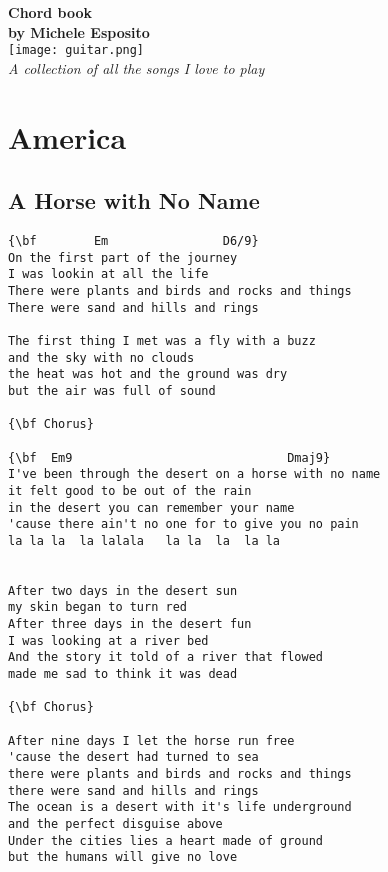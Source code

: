 \documentclass[a4paper]{article}
\begin{document}
\begin{center}
\vspace{3cm}
{\bf{\huge Chord book}}\\
\vspace{2cm}
{\bf by Michele Esposito} \\
\vspace{2cm}
\texttt{[image: guitar.png]}\\
\vspace{1cm}
\emph{A collection of all the songs I love to play}
\end{center}
\newpage
\tableofcontents
\newpage

\section{America} %
\label{sec:America}
\subsection{A Horse with No Name} %
\label{sub:A Horse with No Name}
\begin{Verbatim}[commandchars=\\\{\}]
{\bf        Em                D6/9}
On the first part of the journey
I was lookin at all the life
There were plants and birds and rocks and things
There were sand and hills and rings

The first thing I met was a fly with a buzz
and the sky with no clouds
the heat was hot and the ground was dry
but the air was full of sound

{\bf Chorus}

{\bf  Em9                              Dmaj9}
I've been through the desert on a horse with no name
it felt good to be out of the rain
in the desert you can remember your name
'cause there ain't no one for to give you no pain
la la la  la lalala   la la  la  la la


After two days in the desert sun
my skin began to turn red
After three days in the desert fun
I was looking at a river bed
And the story it told of a river that flowed
made me sad to think it was dead

{\bf Chorus}

After nine days I let the horse run free
'cause the desert had turned to sea
there were plants and birds and rocks and things
there were sand and hills and rings
The ocean is a desert with it's life underground
and the perfect disguise above
Under the cities lies a heart made of ground
but the humans will give no love
\end{Verbatim}
\newpage
\end{document}
